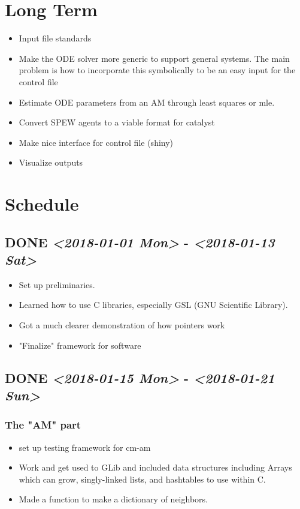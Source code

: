 \documentclass{article}
\begin{document}
\section{Long Term}
\label{sec-5}
\begin{itemize}
\item Input file standards
\item Make the ODE solver more generic to support general systems.  The main problem is how to incorporate this symbolically to be an easy input for the control file
\item Estimate ODE parameters from an AM through least squares or mle.
\item Convert SPEW agents to a viable format for catalyst
\item Make nice interface for control file (shiny)
\item Visualize outputs
\end{itemize}

\section{Schedule}
\label{sec-6}
\subsection{{\bfseries\sffamily DONE} \textit{<2018-01-01 Mon>} - \textit{<2018-01-13 Sat>}}
\label{sec-6-1}
\begin{itemize}
\item Set up preliminaries.
\item Learned how to use C libraries, especially GSL (GNU Scientific Library).
\item Got a much clearer demonstration of how pointers work
\item "Finalize" framework for software
\end{itemize}

\subsection{{\bfseries\sffamily DONE} \textit{<2018-01-15 Mon>} - \textit{<2018-01-21 Sun>}}
\label{sec-6-2}
\subsubsection{The "AM" part}
\label{sec-6-2-1}
\begin{itemize}
\item set up testing framework for cm-am
\item Work and get used to GLib and included data structures including Arrays which can grow, singly-linked lists, and hashtables to use within C.
\item Made a function to make a dictionary of neighbors.
\end{itemize}
\end{document}
